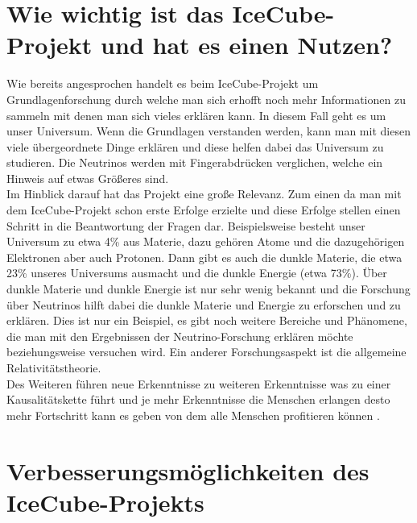    \section{Wie wichtig ist das IceCube-Projekt und hat es einen Nutzen?}

    Wie bereits angesprochen handelt es beim IceCube-Projekt um Grundlagenforschung durch welche man sich 
    erhofft noch mehr Informationen zu sammeln mit denen man sich vieles erklären kann. In diesem Fall 
    geht es um unser Universum. Wenn die Grundlagen verstanden werden, kann man mit diesen viele übergeordnete 
    Dinge erklären und diese helfen dabei das Universum zu studieren. Die Neutrinos werden mit Fingerabdrücken 
    verglichen, welche ein Hinweis auf etwas Größeres sind. \\
    Im Hinblick darauf hat das Projekt eine große Relevanz. Zum einen da man mit dem IceCube-Projekt schon 
    erste Erfolge erzielte und diese Erfolge stellen einen Schritt in die Beantwortung der Fragen dar. 
    Beispielsweise besteht unser Universum zu etwa 4\% aus Materie, dazu gehören Atome und die dazugehörigen 
    Elektronen aber auch Protonen. Dann gibt es auch die dunkle Materie, die etwa 23\% unseres Universums 
    ausmacht und die dunkle Energie (etwa 73\%). Über dunkle Materie und dunkle Energie ist nur sehr wenig 
    bekannt und die Forschung über Neutrinos hilft dabei die dunkle Materie und Energie zu erforschen und zu 
    erklären. Dies ist nur ein Beispiel, es gibt noch weitere Bereiche und Phänomene, die man mit den 
    Ergebnissen der Neutrino-Forschung erklären möchte beziehungsweise versuchen wird. Ein anderer 
    Forschungsaspekt ist die allgemeine Relativitätstheorie. \\
    Des Weiteren führen neue Erkenntnisse zu weiteren Erkenntnisse was zu einer Kausalitätskette führt 
    und je mehr Erkenntnisse die Menschen erlangen desto mehr Fortschritt kann es geben von dem alle 
    Menschen profitieren können \cite{FAQ13}.

    \section{Verbesserungsmöglichkeiten des IceCube-Projekts}

